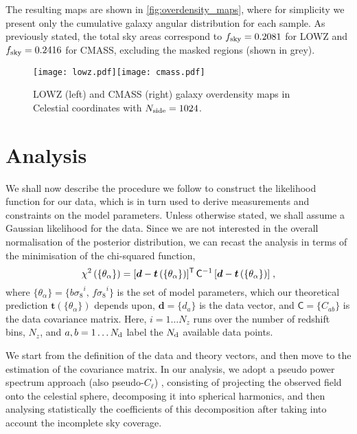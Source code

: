\documentclass[astrosymb,twocolumn]{aastex631}
\newcommand{\bs}{\ensuremath{b\sigma_8}}
\renewcommand{\fs}{\ensuremath{f\!\sigma_8}}
\begin{document}
The resulting maps are shown in \autoref{fig:overdensity_maps}, where for simplicity we present only the cumulative galaxy angular distribution for each sample. As previously stated, the total sky areas correspond to \(f_{\rm sky}=0.2081\) for LOWZ and \(f_{\rm sky}=0.2416\) for CMASS, excluding the masked regions (shown in grey).
\begin{figure*}
\centering
\texttt{[image: lowz.pdf]}\texttt{[image: cmass.pdf]}
\caption{LOWZ (left) and CMASS (right) galaxy overdensity maps in Celestial coordinates with  \(N_{\rm side}=1024\).}
\label{fig:overdensity_maps}
\end{figure*}

\section{Analysis}
\label{sec:analysis}
We shall now describe the procedure we follow to construct the likelihood function for our data, which is in turn used to derive measurements and constraints on the model parameters. Unless otherwise stated, we shall assume a Gaussian likelihood for the data. Since we are not interested in the overall normalisation of the posterior distribution, we can recast the analysis in terms of the minimisation of the chi-squared function,
\begin{equation}
     \chi^2\left(\{\theta_\alpha\}\right) = [\bm d - {\bm t}\left(\{\theta_\alpha\}\right)]^{\sf T}\,\mathsf C^{-1}\,[\bm d - {\bm t}\left(\{\theta_\alpha\}\right)]\;,
    \label{eq:chi2}
\end{equation}
where \(\{\theta_\alpha\}=\{\bs^i,\,\fs^i\}\) is the set of model parameters, which our theoretical prediction \(\bm t(\{\theta_\alpha\})\) depends upon, \(\bm d=\{d_a\}\) is the data vector, and \(\mathsf C=\{C_{ab}\}\) is the data covariance matrix. Here, \(i=1\ldots N_z\) runs over the number of redshift bins, \(N_z\), and \(a,b=1\ldots N_{\rm d}\) label the \(N_{\rm d}\) available data points.

We start from the definition of the data and theory vectors, and then move to the estimation of the covariance matrix. In our analysis, we adopt a pseudo power spectrum approach (also pseudo-\(C_\ell\)) \citep{Huterer_2001, Blake_2004,Ho_2012, Balaguera-Antolinez_2018}, consisting of projecting the observed field onto the celestial sphere, decomposing it into spherical harmonics, and then analysing statistically the coefficients of this decomposition after taking into account the incomplete sky coverage.
\end{document}
